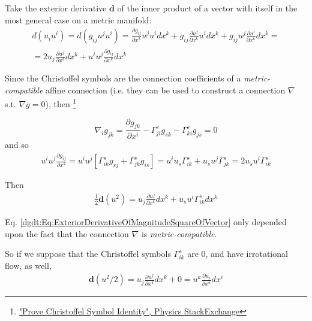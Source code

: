 Take the exterior derivative $\mathbf{d}$ of the inner product of a vector with itself in the most general case on a metric manifold:
\[
\begin{gathered}
d(u_i u^i) = d(g_{ij} u^j u^i) = \frac{ \partial g_{ij} }{ \partial x^k} u^j u^i dx^k  + g_{ij} \frac{ \partial u^j}{ \partial x^k} u^i dx^k + g_{ij} u^j \frac{\partial u^i}{\partial x^k} dx^k = \\
= 2 u_j \frac{ \partial u^j}{\partial x^k} dx^k + u^i u^j \frac{\partial g_{ij}}{\partial x^k} dx^k 
\end{gathered}
\]


Since the Christoffel symbols are the connection coefficients of a \emph{metric-compatible} affine connection (i.e. they can be used to construct a connection $\nabla$ s.t. $\nabla g = 0$), then \footnote{ \href{https://physics.stackexchange.com/questions/175235/prove-christoffel-symbol-identity}{"Prove Christoffel Symbol Identity", Physics StackExchange}}

\begin{equation}
\nabla_i g_{jk} = \frac{ \partial g_{jk}}{\partial x^i} - \Gamma^s_{ji} g_{sk} - \Gamma^s_{ki} g_{js} = 0
\end{equation}
and so
\begin{equation}
\begin{gathered}
 u^i u^j \frac{ \partial g_{ij}}{\partial x^k} = u^i u^j \left[ \Gamma^s_{ik} g_{sj} + \Gamma^s_{jk} g_{is} \right] = u^i u_s \Gamma^s_{ik} + u_s u^j \Gamma^s_{jk} = 2u_s u^i \Gamma^s_{ik}
\end{gathered}
\end{equation}



Then 
\begin{equation}\label{dgdt:Eq:ExteriorDerivativeOfMagnitudeSquareOfVector}
\begin{gathered}
\frac{1}{2} \mathbf{d}(u^2) = u_j \frac{ \partial u^j}{\partial x^k} dx^k + u_s u^i \Gamma^s_{ik} dx^k
\end{gathered}
\end{equation}

Eq. \ref{dgdt:Eq:ExteriorDerivativeOfMagnitudeSquareOfVector} only depended upon the fact that the connection $\nabla$ is \emph{metric-compatible}.

So if we suppose that the Christoffel symbols $\Gamma^s_{ik}$ are 0, and have irrotational flow, as well,
\[
\begin{gathered}
\mathbf{d}(u^2 / 2) = u_j \frac{\partial u^j}{ \partial x^k} dx^k  + 0 = u^a \frac{ \partial u_i}{\partial x^a} dx^i 
\end{gathered}
\]


